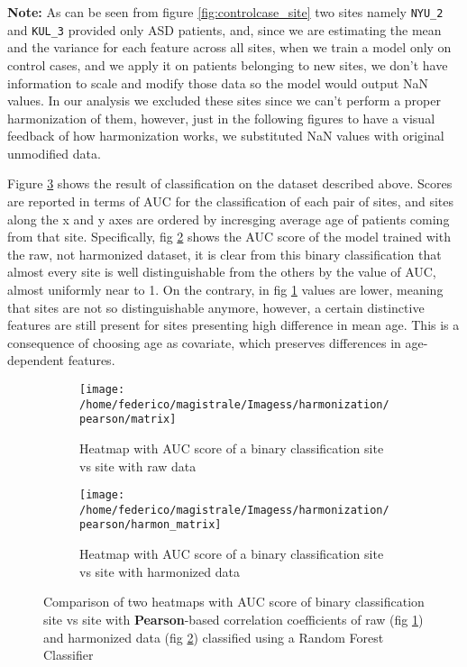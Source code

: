 \documentclass[10pt]{report}
\begin{document}
\textbf{Note:} As can be seen from figure \ref{fig:controlcase_site} two sites namely \texttt{NYU\_2} and \texttt{KUL\_3} provided only ASD patients, and, since we are estimating the mean and the variance for each feature across all sites, when we train a model only on control cases, and we apply it on patients belonging to new sites, we don't have information to scale and modify those data so the model would output NaN values.
In our analysis we excluded these sites since we can't perform a proper harmonization of them, however, just in the following figures to have a visual feedback of how harmonization works, we substituted NaN values with original unmodified data.
\newline

Figure \ref{fig:heatmap_harmonization} shows the result of classification on the dataset described above. Scores are reported in terms of AUC for the classification of each pair of sites, and sites along the x and y axes are ordered by incresging average age of patients coming from that site.
Specifically, fig \ref{fig:heatmap_harmonization_noharmon} shows the AUC score of the model trained with the raw, not harmonized dataset, it is clear from this binary classification that almost every site is well distinguishable from the others by the value of AUC, almost uniformly near to 1.
On the contrary, in fig \ref{fig:heatmap_harmonization_harmon} values are lower, meaning that sites are not so distinguishable anymore, however, a certain distinctive features are still present for sites presenting high difference in mean age.
This is a consequence of choosing age as covariate, which preserves differences in age-dependent features.



\begin{figure}
\centering
\begin{subfigure}[b]{0.8\textwidth}
   \texttt{[image: /home/federico/magistrale/Imagess/harmonization/pearson/matrix]}
   \caption{Heatmap with AUC score of a binary classification site vs site with raw data}
   \label{fig:heatmap_harmonization_harmon}
\end{subfigure}

\begin{subfigure}[b]{0.8\textwidth}
   \texttt{[image: /home/federico/magistrale/Imagess/harmonization/pearson/harmon\_matrix]}
   \caption{Heatmap with AUC score of a binary classification site vs site with harmonized data}
   \label{fig:heatmap_harmonization_noharmon}
\end{subfigure}

\caption{Comparison of two heatmaps with AUC score of binary classification site vs site with \textbf{Pearson}-based correlation coefficients of raw (fig \ref{fig:heatmap_harmonization_harmon}) and harmonized data (fig \ref{fig:heatmap_harmonization_noharmon}) classified using a Random Forest Classifier
}
\label{fig:heatmap_harmonization}
\end{figure}
\end{document}
